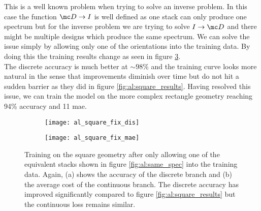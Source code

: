 \newpage
This is a well known problem when trying to solve an inverse problem.
In this case the function $\mc D \rightarrow I$ is well defined as one stack can only produce one spectrum but for the inverse problem we are trying to solve $I \rightarrow \mc D$ and there might be multiple designs which produce the same spectrum. We can solve the issue simply by allowing only one of the orientations into the training data. By doing this the training  results change as seen in figure \ref{fig:al:squares_fix}.
\\

\indent
The discrete accuracy is much better at $\sim 98 \%$ and the training curve looks more natural in the sense that improvements diminish over time but do not hit a sudden barrier as they did in figure \ref{fig:al:square_results}.
Having resolved this issue, we can train the model on the more complex rectangle geometry reaching 94\% accuracy and 11 mae.


\begin{figure}[H]
\centering
\begin{subfigure}{.5\textwidth}
    \centering
    \texttt{[image: al\_square\_fix\_dis]}
    \caption{}
    \label{}
\end{subfigure}%
\begin{subfigure}{.5\textwidth}
    \centering
    \texttt{[image: al\_square\_fix\_mae]}
    \caption{}
    \label{}
\end{subfigure}
\caption{Training on the square geometry after only allowing one of the equivalent stacks shown in figure \ref{fig:al:same_spec} into the training data.
Again, (a) shows the accuracy of the discrete branch and (b) the average cost of the continuous branch. The discrete accuracy has improved significantly compared to figure \ref{fig:al:square_results} but the continuous loss remains similar.}
\label{fig:al:squares_fix}
\end{figure}

